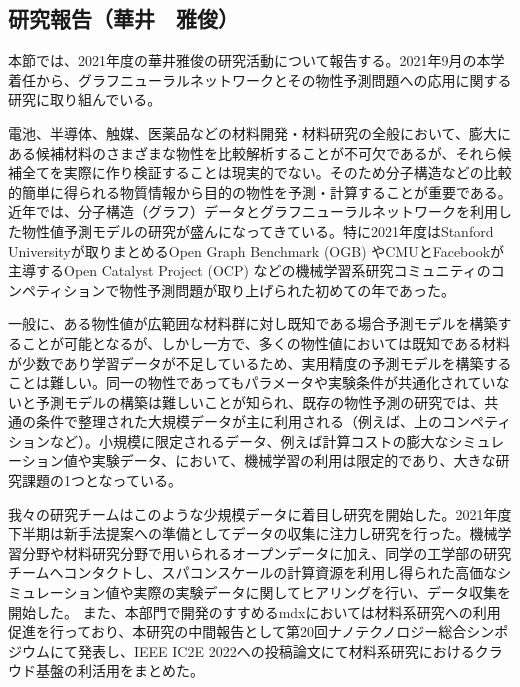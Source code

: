 \subsection{研究報告（華井　雅俊）}

本節では、2021年度の華井雅俊の研究活動について報告する。2021年9月の本学着任から、グラフニューラルネットワークとその物性予測問題への応用に関する研究に取り組んでいる。

電池、半導体、触媒、医薬品などの材料開発・材料研究の全般において、膨大にある候補材料のさまざまな物性を比較解析することが不可欠であるが、それら候補全てを実際に作り検証することは現実的でない。そのため分子構造などの比較的簡単に得られる物質情報から目的の物性を予測・計算することが重要である。近年では、分子構造（グラフ）データとグラフニューラルネットワークを利用した物性値予測モデルの研究が盛んになってきている。特に2021年度はStanford Universityが取りまとめるOpen Graph Benchmark (OGB) やCMUとFacebookが主導するOpen Catalyst Project (OCP) などの機械学習系研究コミュニティのコンペティションで物性予測問題が取り上げられた初めての年であった。

一般に、ある物性値が広範囲な材料群に対し既知である場合予測モデルを構築することが可能となるが、しかし一方で、多くの物性値においては既知である材料が少数であり学習データが不足しているため、実用精度の予測モデルを構築することは難しい。同一の物性であってもパラメータや実験条件が共通化されていないと予測モデルの構築は難しいことが知られ、既存の物性予測の研究では、共通の条件で整理された大規模データが主に利用される（例えば、上のコンペティションなど）。小規模に限定されるデータ、例えば計算コストの膨大なシミュレーション値や実験データ、において、機械学習の利用は限定的であり、大きな研究課題の1つとなっている。

我々の研究チームはこのような少規模データに着目し研究を開始した。2021年度下半期は新手法提案への準備としてデータの収集に注力し研究を行った。機械学習分野や材料研究分野で用いられるオープンデータに加え、同学の工学部の研究チームへコンタクトし、スパコンスケールの計算資源を利用し得られた高価なシミュレーション値や実際の実験データに関してヒアリングを行い、データ収集を開始した。
また、本部門で開発のすすめるmdxにおいては材料系研究への利用促進を行っており、本研究の中間報告として第20回ナノテクノロジー総合シンポジウムにて発表し、IEEE IC2E 2022への投稿論文にて材料系研究におけるクラウド基盤の利活用をまとめた。




